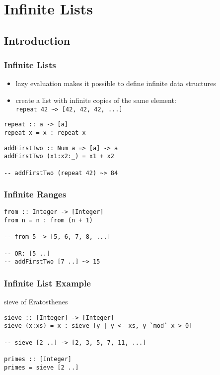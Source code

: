 \documentclass[dvipsnames]{beamer}
\theoremstyle{plain}
\begin{document}
\section{Infinite Lists}

\subsection{Introduction}

\begin{frame}[fragile]
  \frametitle{Infinite Lists}

  \begin{itemize}
    \item lazy evaluation makes it possible to define infinite data structures
    \item create a list with infinite copies of the same element:\\
      \lstinline|repeat 42 ~> [42, 42, 42, ...]|
  \end{itemize}

  \begin{exampleblock}{}
    \begin{lstlisting}[deletekeywords={repeat}]
repeat :: a -> [a]
repeat x = x : repeat x
    \end{lstlisting}

    \pause
    \medskip
    \begin{lstlisting}
addFirstTwo :: Num a => [a] -> a
addFirstTwo (x1:x2:_) = x1 + x2

-- addFirstTwo (repeat 42) ~> 84
    \end{lstlisting}
  \end{exampleblock}
\end{frame}

\begin{frame}[fragile]
  \frametitle{Infinite Ranges}

  \begin{exampleblock}{}
    \begin{lstlisting}
from :: Integer -> [Integer]
from n = n : from (n + 1)

-- from 5 -> [5, 6, 7, 8, ...]

-- OR: [5 ..]
-- addFirstTwo [7 ..] ~> 15
    \end{lstlisting}
  \end{exampleblock}
\end{frame}

\begin{frame}[fragile]
  \frametitle{Infinite List Example}

  \begin{exampleblock}{sieve of Eratosthenes}
    \begin{lstlisting}
sieve :: [Integer] -> [Integer]
sieve (x:xs) = x : sieve [y | y <- xs, y `mod` x > 0]

-- sieve [2 ..] -> [2, 3, 5, 7, 11, ...]

primes :: [Integer]
primes = sieve [2 ..]
    \end{lstlisting}
  \end{exampleblock}
\end{frame}
\end{document}
